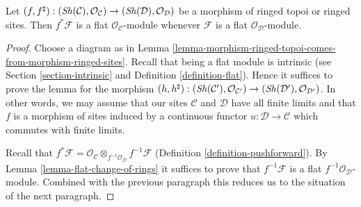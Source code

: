 \begin{lemma}
\label{lemma-pullback-flat}
\begin{reference}
\cite[Expos\'e V, Corollary 1.7.1]{SGA4}
\end{reference}
Let
$(f, f^\sharp) :
(\mathop{\mathit{Sh}}\nolimits(\mathcal{C}), \mathcal{O}_\mathcal{C})
\to
(\mathop{\mathit{Sh}}\nolimits(\mathcal{D}), \mathcal{O}_\mathcal{D})$
be a morphism of ringed topoi or ringed sites.
Then $f^*\mathcal{F}$ is a flat $\mathcal{O}_\mathcal{C}$-module
whenever $\mathcal{F}$ is a flat $\mathcal{O}_\mathcal{D}$-module.
\end{lemma}

\begin{proof}
Choose a diagram as in
Lemma \ref{lemma-morphism-ringed-topoi-comes-from-morphism-ringed-sites}.
Recall that being a flat module is intrinsic
(see Section \ref{section-intrinsic} and
Definition \ref{definition-flat}).
Hence it suffices to prove the lemma for
the morphism $(h, h^\sharp) :
(\mathop{\mathit{Sh}}\nolimits(\mathcal{C}'), \mathcal{O}_{\mathcal{C}'})
\to
(\mathop{\mathit{Sh}}\nolimits(\mathcal{D}'), \mathcal{O}_{\mathcal{D}'})$.
In other words, we may assume that
our sites $\mathcal{C}$ and $\mathcal{D}$
have all finite limits and that $f$ is a morphism
of sites induced by a continuous functor $u : \mathcal{D} \to \mathcal{C}$
which commutes with finite limits.

\medskip\noindent
Recall that $f^*\mathcal{F} =
\mathcal{O}_\mathcal{C} \otimes_{f^{-1}\mathcal{O}_\mathcal{D}}
f^{-1}\mathcal{F}$ (Definition \ref{definition-pushforward}).
By Lemma \ref{lemma-flat-change-of-rings} it suffices to
prove that $f^{-1}\mathcal{F}$ is a flat
$f^{-1}\mathcal{O}_\mathcal{D}$-module. Combined with
the previous paragraph this reduces us to the situation
of the next paragraph.


\end{proof}
